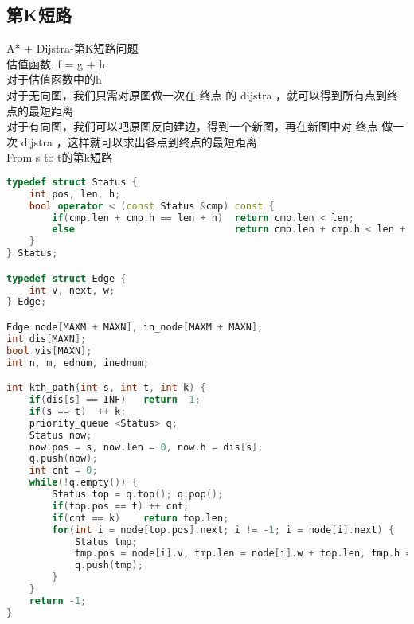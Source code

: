 \subsection{第K短路}
A* + Dijstra-第K短路问题\\
估值函数: f = g + h\\
对于估值函数中的h|\\
对于无向图，我们只需对原图做一次在 终点 的 dijstra ，就可以得到所有点到终点的最短距离\\
对于有向图，我们可以吧原图反向建边，得到一个新图，再在新图中对 终点 做一次 dijstra ，这样就可以求出各点到终点的最短距离\\
From s to t的第k短路\\
    \begin{lstlisting}[language=c++]
typedef struct Status {
    int pos, len, h;
    bool operator < (const Status &cmp) const {
        if(cmp.len + cmp.h == len + h)  return cmp.len < len;
        else                            return cmp.len + cmp.h < len + h;
    }
} Status;

typedef struct Edge {
    int v, next, w;
} Edge;

Edge node[MAXM + MAXN], in_node[MAXM + MAXN];
int dis[MAXN];
bool vis[MAXN];
int n, m, ednum, inednum;

int kth_path(int s, int t, int k) {
    if(dis[s] == INF)   return -1;
    if(s == t)  ++ k;
    priority_queue <Status> q;
    Status now;
    now.pos = s, now.len = 0, now.h = dis[s];
    q.push(now);
    int cnt = 0;
    while(!q.empty()) {
        Status top = q.top(); q.pop();
        if(top.pos == t) ++ cnt;
        if(cnt == k)    return top.len;
        for(int i = node[top.pos].next; i != -1; i = node[i].next) {
            Status tmp;
            tmp.pos = node[i].v, tmp.len = node[i].w + top.len, tmp.h = dis[node[i].v];
            q.push(tmp);
        }
    }
    return -1;
}
    \end{lstlisting}
